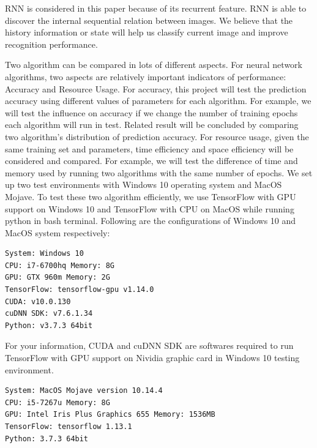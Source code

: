 \documentclass[letterpaper]{article} %
\begin{document}
RNN is considered in this paper because of its recurrent feature. RNN is able to discover the internal sequential relation between images. We believe that the history information or state will help us classify current image and improve recognition performance.

Two algorithm can be compared in lots of different aspects. For neural network algorithms, two aspects are relatively important indicators of performance: Accuracy and Resource Usage. For accuracy, this project will test the prediction accuracy using different values of parameters for each algorithm. For example, we will test the influence on accuracy if we change the number of training epochs each algorithm will run in test. Related result will be concluded by comparing two algorithm’s distribution of prediction accuracy. For resource usage, given the same training set and parameters, time efficiency and space efficiency will be considered and compared. For example, we will test the difference of time and memory used by running two algorithms with the same number of epochs.
We set up two test environments with Windows 10 operating system and MacOS Mojave. To test these two algorithm efficiently, we use TensorFlow with GPU support on Windows 10 and TensorFlow with CPU on MacOS while running python in bash terminal. Following are the configurations of Windows 10 and MacOS system respectively:
\begin{lstlisting}[columns=fullflexible, keepspaces=true, stepnumber=1]
System: Windows 10
CPU: i7-6700hq Memory: 8G
GPU: GTX 960m Memory: 2G
TensorFlow: tensorflow-gpu v1.14.0
CUDA: v10.0.130
cuDNN SDK: v7.6.1.34
Python: v3.7.3 64bit
\end{lstlisting}
For your information, CUDA and cuDNN SDK are softwares required to run TensorFlow with GPU support on Nividia graphic card in Windows 10 testing environment. 
\begin{lstlisting}[columns=fullflexible, keepspaces=true, stepnumber=1]
System: MacOS Mojave version 10.14.4
CPU: i5-7267u Memory: 8G
GPU: Intel Iris Plus Graphics 655 Memory: 1536MB
TensorFlow: tensorflow 1.13.1
Python: 3.7.3 64bit
\end{lstlisting}



\newpage


\end{document}
